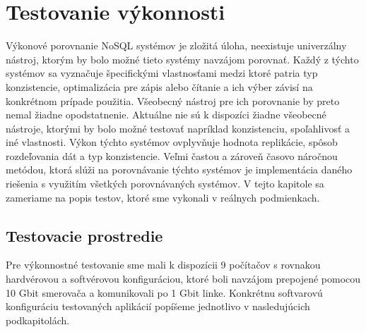 \documentclass[11pt,twoside,a4paper]{book}
\begin{document}
% 
% 



% 
% 
% 
% 
% 
% 
% 


\chapter{Testovanie výkonnosti}
\label{chapter:testovanie}

Výkonové porovnanie NoSQL systémov je zložitá úloha, neexistuje univerzálny nástroj, ktorým by bolo možné tieto systémy navzájom porovnať. 
Každý z týchto systémov sa vyznačuje špecifickými vlastnosťami medzi ktoré patria typ konzistencie, optimalizácia pre zápis alebo čítanie a ich výber závisí na konkrétnom prípade použitia. Všeobecný nástroj pre ich porovnanie by preto nemal žiadne opodstatnenie. Aktuálne nie sú k dispozíci žiadne všeobecné nástroje, ktorými by bolo možné testovať napríklad konzistenciu, spoľahlivosť a iné vlastnosti. Výkon týchto systémov ovplyvňuje hodnota replikácie, spôsob rozdeľovania dát a typ konzistencie. Veľmi častou a zároveň časovo náročnou metódou, ktorá slúži na porovnávanie týchto systémov je implementácia daného riešenia s využitím všetkých porovnávaných systémov. V tejto kapitole sa zameriame na popis testov, ktoré sme vykonali v reálnych podmienkach.



\section{Testovacie prostredie}

Pre výkonnostné testovanie sme mali k dispozícii 9 počítačov s rovnakou hardvérovou a softvérovou konfiguráciou, ktoré boli navzájom prepojené pomocou 10 Gbit smerovača a komunikovali po 1 Gbit linke. Konkrétnu softvarovú konfiguráciu testovaných aplikácií popíšeme jednotlivo v nasledujúcich podkapitolách.
\end{document}

